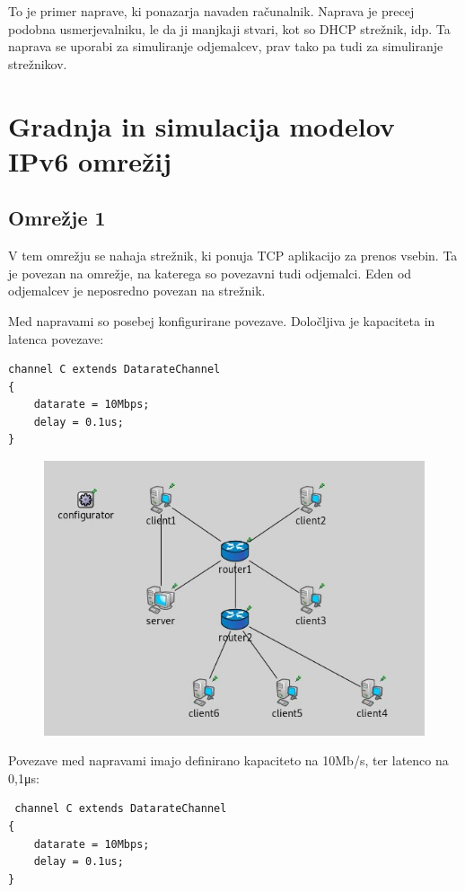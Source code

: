 \documentclass[11pt,a4paper,slovene]{myarticle}
\begin{document}
To je primer naprave, ki ponazarja navaden računalnik. Naprava je precej podobna usmerjevalniku, le da ji manjkaji stvari, kot so DHCP strežnik, idp.
Ta naprava se uporabi za simuliranje odjemalcev, prav tako pa tudi za simuliranje strežnikov.


\section{Gradnja in simulacija modelov IPv6 omrežij}

\subsection{Omrežje 1}
V tem omrežju se nahaja strežnik, ki ponuja TCP aplikacijo za prenos vsebin. Ta je povezan na omrežje,
na katerega so povezavni tudi odjemalci. Eden od odjemalcev je neposredno povezan na strežnik.

Med napravami so posebej konfigurirane povezave. Določljiva je kapaciteta in latenca povezave:
\begin{lstlisting}
channel C extends DatarateChannel
{
    datarate = 10Mbps;
    delay = 0.1us;
}
\end{lstlisting}


\begin{figure}[h]
  \includegraphics[width=\linewidth]{omrezje1.jpg}
\end{figure}

Povezave med napravami imajo definirano kapaciteto na 10Mb/s, ter latenco na 0,1μs:
\begin{lstlisting}
 channel C extends DatarateChannel
{
    datarate = 10Mbps;
    delay = 0.1us;
}
\end{lstlisting}
\end{document}
